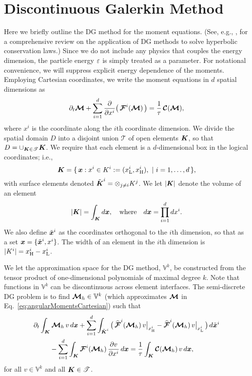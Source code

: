 \section{Discontinuous Galerkin Method}
\label{sec:dg}

Here we briefly outline the DG method for the moment equations.  
(See, e.g., \cite{cockburnShu_2001}, for a comprehensive review on the application of DG methods to solve hyperbolic conservation laws.)  
Since we do not include any physics that couples the energy dimension, the particle energy $\varepsilon$ is simply treated as a parameter.  
For notational convenience, we will suppress explicit energy dependence of the moments.  
Employing Cartesian coordinates, we write the moment equations in $d$ spatial dimensions as
\begin{equation}
  \partial_{t}{\boldsymbol{\mathcal{M}}}+\sum_{i=1}^{d}\frac{\partial }{\partial x^{i}}\big(\,\boldsymbol{\mathcal{F}}^{i}(\boldsymbol{\mathcal{M}})\,\big)
  =\frac{1}{\tau}\,\boldsymbol{\mathcal{C}}(\boldsymbol{\mathcal{M}}),
  \label{eq:angularMomentsCartesian}
\end{equation}
where $x^{i}$ is the coordinate along the $i$th coordinate dimension.  
We divide the spatial domain $D$ into a disjoint union $\mathscr{T}$ of open elements $\boldsymbol{K}$, so that $D = \cup_{\boldsymbol{K} \in \mathscr{T}}\boldsymbol{K}$.  
We require that each element is a $d$-dimensional box in the logical coordinates; i.e.,
\begin{equation}
  \boldsymbol{K}=\{\,\boldsymbol{x} : x^{i} \in K^{i} := (x_{{\rm L}}^{i},x_{{\rm H}}^{i}),~|~i=1,\ldots,d\,\}, 
\end{equation}
with surface elements denoted $\tilde{\boldsymbol{K}}^{i}=\otimes_{j\ne i}K^{j}$.  
We let $|\boldsymbol{K}|$ denote the volume of an element
\begin{equation}
  |\boldsymbol{K}| = \int_{\boldsymbol{K}}d\boldsymbol{x}, \quad\text{where}\quad d\boldsymbol{x} = \prod_{i=1}^{d}dx^{i}.  
\end{equation}
We also define $\tilde{\boldsymbol{x}}^{i}$ as the coordinates orthogonal to the $i$th dimension, so that as a set $\boldsymbol{x}=\{\tilde{\boldsymbol{x}}^{i},x^{i}\}$.  
The width of an element in the $i$th dimension is $|K^{i}|=x_{{\rm H}}^{i}-x_{{\rm L}}^{i}$.  

We let the approximation space for the DG method, $\mathbb{V}^{k}$, be constructed from the tensor product of one-dimensional polynomials of maximal degree $k$.  
Note that functions in $\mathbb{V}^{k}$ can be discontinuous across element interfaces.  
The semi-discrete DG problem is to find $\boldsymbol{\mathcal{M}}_{h}\in\mathbb{V}^{k}$ (which approximates $\boldsymbol{\mathcal{M}}$ in Eq.~\eqref{eq:angularMomentsCartesian}) such that
\begin{align}
  &\partial_{t}{}\int_{\boldsymbol{K}}\boldsymbol{\mathcal{M}}_{h}\,v\,d\boldsymbol{x}
  +\sum_{i=1}^{d}\int_{\tilde{\boldsymbol{K}}^{i}}
  \big(\,
    \widehat{\boldsymbol{\mathcal{F}}}^{i}(\boldsymbol{\mathcal{M}}_{h})\,v\big|_{x_{{\rm H}}^{i}}
    -\widehat{\boldsymbol{\mathcal{F}}}^{i}(\boldsymbol{\mathcal{M}}_{h})\,v\big|_{x_{{\rm L}}^{i}}
  \,\big)\,d\tilde{\boldsymbol{x}}^{i} \nonumber \\
  &\hspace{24pt}
  -\sum_{i=1}^{d}\int_{\boldsymbol{K}}\boldsymbol{\mathcal{F}}^{i}(\boldsymbol{\mathcal{M}}_{h})\,\frac{\partial v}{\partial x^{i}}\,d\boldsymbol{x}
  =\frac{1}{\tau}\int_{\boldsymbol{K}}\boldsymbol{\mathcal{C}}(\boldsymbol{\mathcal{M}}_{h})\,v\,d\boldsymbol{x},
  \label{eq:semidiscreteDG}
\end{align}
for all $v\in\mathbb{V}^{k}$ and all $\boldsymbol{K}\in\mathscr{T}$.  

